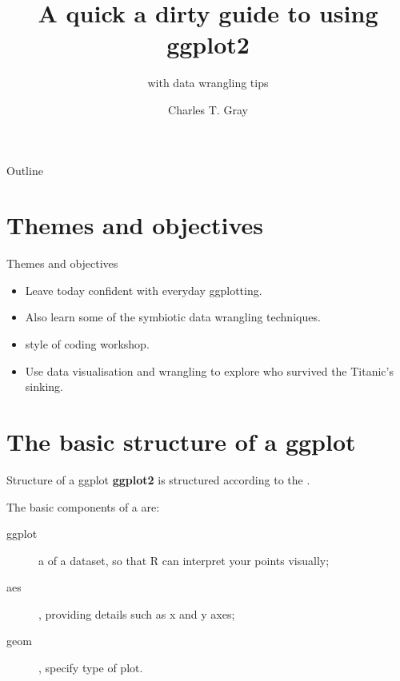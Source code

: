 \documentclass{beamer}
\title{A quick a dirty guide to using ggplot2}
\subtitle{with data wrangling tips}
\author{Charles T. Gray}
\institute{Salim Group Journal Club}
\begin{document}
\begin{frame}
\maketitle
\end{frame}

\begin{frame}{Outline}
\tableofcontents
\end{frame}

\section{Themes and objectives}
\begin{frame}{Themes and objectives}
\begin{itemize}
\item Leave today confident with everyday ggplotting.
\item Also learn some of the symbiotic data wrangling techniques.
\item {} style of coding workshop.
\item Use data visualisation and wrangling to explore who survived the Titanic's sinking.
\end{itemize}
\end{frame}

\section{The basic structure of a ggplot}
\begin{frame}{Structure of a ggplot}
\textbf{ggplot2} is structured according to the .

\bigskip

The basic components of a  are:
\begin{description}
\item[ggplot]  a  of a dataset, so that R can interpret your points visually;
\item [aes] , providing details such as x and y axes;
\item [geom] , specify type of plot.
\end{description}
\end{frame}
\end{document}
